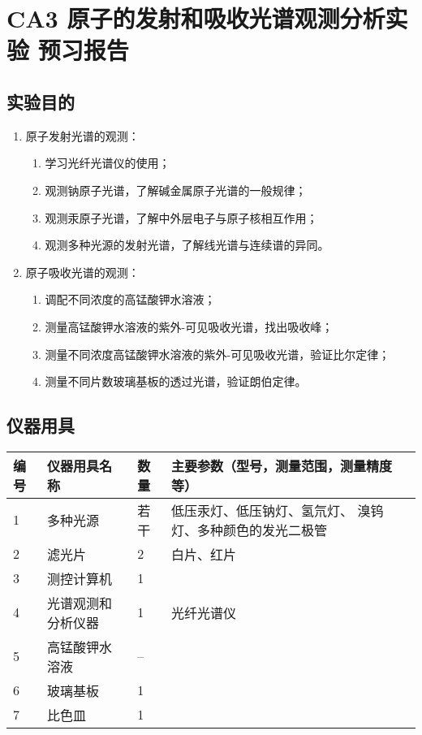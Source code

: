 \documentclass[dvipsnames, svgnames,a4paper,11pt]{article}
\begin{document}
\setcounter{section}{0}
\section{CA3 \quad 原子的发射和吸收光谱观测分析实验 \quad\heiti 预习报告}
	
\subsection{实验目的}
	\begin{enumerate}
		\item 原子发射光谱的观测：
			\begin{enumerate}
				\item 学习光纤光谱仪的使用；
				\item 观测钠原子光谱，了解碱金属原子光谱的一般规律；
				\item 观测汞原子光谱，了解中外层电子与原子核相互作用；
				\item 观测多种光源的发射光谱，了解线光谱与连续谱的异同。
			\end{enumerate}
		\item  原子吸收光谱的观测：
			\begin{enumerate}
				\item 调配不同浓度的高锰酸钾水溶液；
				\item 测量高锰酸钾水溶液的紫外-可见吸收光谱，找出吸收峰；
				\item 测量不同浓度高锰酸钾水溶液的紫外-可见吸收光谱，验证比尔定律；
				\item 测量不同片数玻璃基板的透过光谱，验证朗伯定律。
			\end{enumerate}
	\end{enumerate}
	

\subsection{仪器用具}
	\begin{table}[htbp]
		\centering
		\renewcommand\arraystretch{1.6}
		\begin{tabular}{p{}|p{}|p{}|p{}}
		\hline
		编号& 仪器用具名称 & 数量 &  主要参数（型号，测量范围，测量精度等） \\
		\hline
		1 & 多种光源 	& 若干	& {\footnotesize 低压汞灯、低压钠灯、氢氘灯、 溴钨灯、多种颜色的发光二极管} \\
	
		2 & 滤光片 	& 2 	& 白片、红片 \\
		
		3 & 测控计算机 & 1 &  \\
		
		4 & 光谱观测和分析仪器 & 1 & 光纤光谱仪\\
		
		5 & 高锰酸钾水溶液 & -- &  \\
		
		6 & 玻璃基板 & 1  &  \\
		
		7 & 比色皿 & 1 & \\
		
		\hline
		\end{tabular}
	\end{table}
\end{document}
